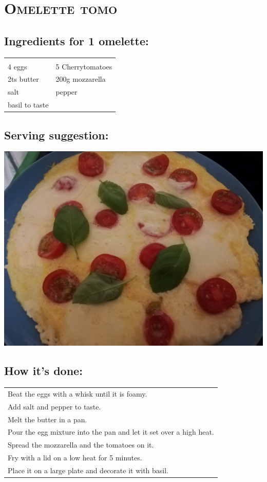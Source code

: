 \section{\textsc{Omelette tomo}}

\subsection*{Ingredients for 1 omelette:}

\begin{tabular}{p{7.5cm} p{7.5cm}}
	& \\
	4 eggs & 5 Cherrytomatoes \\
	2ts butter & 200g mozzarella \\
	salt & pepper \\
	basil to taste &
\end{tabular}

\subsection*{Serving suggestion:}

\includegraphics[width=\textwidth]{img/omlett/omlett_tomo_fertig.jpg} \cite{omlettomo}

\subsection*{How it's done:}

\begin{tabular}{p{15cm}}
	\\
  Beat the eggs with a whisk until it is foamy.\\
  Add salt and pepper to taste.\\
  Melt the butter in a pan.\\
  Pour the egg mixture into the pan and let it set over a high heat.\\
  Spread the mozzarella and the tomatoes on it.\\
  Fry with a lid on a low heat for 5 minutes.\\
  Place it on a large plate and decorate it with basil.
\end{tabular}
